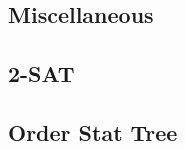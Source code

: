 \documentclass[12pt]{extarticle}
\begin{document}
\begin{multicols*}{2}
\section{Miscellaneous}
\subsection{2-SAT} %


% 

\subsection{Order Stat Tree} %






% 

% 

% 


\end{multicols*}
\end{document}
